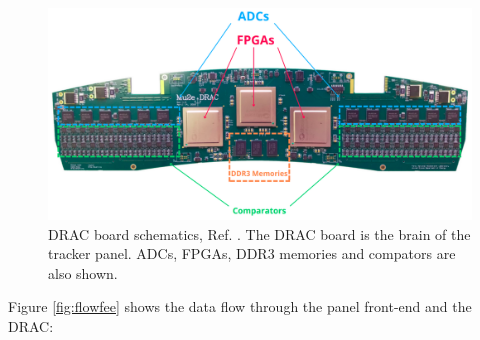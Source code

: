 \begin{figure}[!h]
\centering
\includegraphics[width =\textwidth]{figures/png/Screenshot_20240204_115052.png}
\caption{DRAC board schematics, Ref. \cite{drac}. 
The DRAC board is the brain of the tracker panel. ADCs, FPGAs, DDR3 
memories and compators are also shown.}
\label{fig:drac}
\end{figure}
Figure \ref{fig:flowfee} shows the data flow through the panel front-end and the DRAC:
